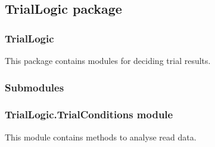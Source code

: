 \documentclass[letterpaper,10pt,english]{sphinxmanual}
\begin{document}
\sphinxstepscope


\subsection{TrialLogic package}
\label{\detokenize{NoSeMazeController/TrialLogic:triallogic-package}}\label{\detokenize{NoSeMazeController/TrialLogic::doc}}

\subsubsection{TrialLogic}
\label{\detokenize{NoSeMazeController/TrialLogic:triallogic}}
\sphinxAtStartPar
This package contains modules for deciding trial results.


\subsubsection{Submodules}
\label{\detokenize{NoSeMazeController/TrialLogic:submodules}}

\subsubsection{TrialLogic.TrialConditions module}
\label{\detokenize{NoSeMazeController/TrialLogic:module-TrialLogic.TrialConditions}}\label{\detokenize{NoSeMazeController/TrialLogic:triallogic-trialconditions-module}}
\sphinxAtStartPar
This module contains methods to analyse read data.
\end{document}
